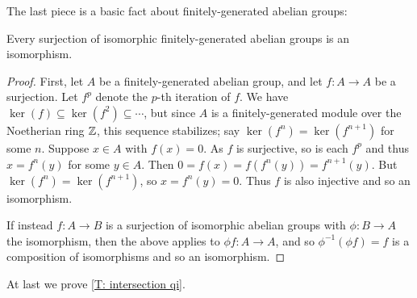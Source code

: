The last piece is a basic fact about finitely-generated abelian groups:


\begin{lemma}\label{L: surjection of isomorphic groups}
	Every surjection of isomorphic finitely-generated abelian groups is an isomorphism.
\end{lemma}
\begin{proof}
	First, let $A$ be a finitely-generated abelian group, and let $f \colon A \to A$ be a surjection.
	Let $f^p$ denote the $p$-th iteration of $f$.
	We have $\ker(f)\subseteq \ker (f^2) \subseteq \cdots$, but since $A$ is a finitely-generated module over the Noetherian ring $\mathbb{Z}$, this sequence stabilizes; say $\ker(f^n)=\ker(f^{n+1})$ for some $n$.
	Suppose $x \in A$ with $f(x) = 0$. As $f$ is surjective, so is each $f^p$ and thus $x = f^n(y)$ for some $y \in A$.
	Then $0 = f(x) = f(f^n(y)) = f^{n+1}(y)$.
	But $\ker(f^n) = \ker(f^{n+1})$, so $x= f^n(y) = 0$.
	Thus $f$ is also injective and so an isomorphism.

	If instead $f: A \to B$ is a surjection of isomorphic abelian groups with $\phi: B \to A$ the isomorphism, then the above applies to $\phi f \colon A \to A$, and so $\phi^{-1}(\phi f) = f$ is a composition of isomorphisms and so an isomorphism.
\end{proof}

At last we prove \cref{T: intersection qi}.


